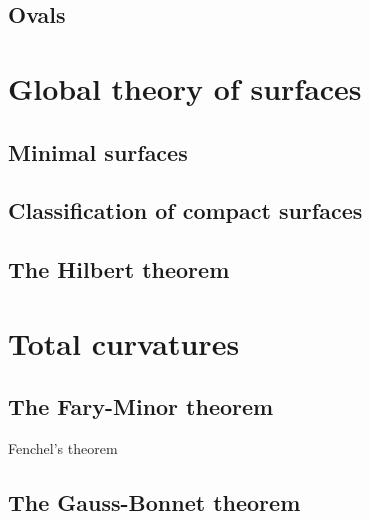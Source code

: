 \documentclass{../note}
\begin{document}
\section{Ovals}


\chapter{Global theory of surfaces}
\section{Minimal surfaces}
\section{Classification of compact surfaces}
\section{The Hilbert theorem}

\chapter{Total curvatures}
\section{The Fary-Minor theorem}
Fenchel's theorem
\section{The Gauss-Bonnet theorem}
\end{document}

